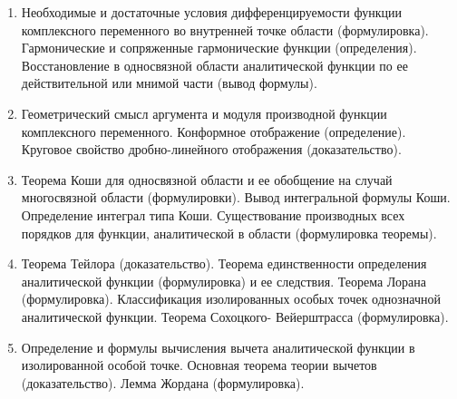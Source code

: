 % 
%

\begin{enumerate}

\item Необходимые и достаточные условия дифференцируемости функции комплексного переменного во внутренней точке области (формулировка). Гармонические и сопряженные гармонические функции (определения). Восстановление в односвязной области  аналитической функции по ее действительной или мнимой части (вывод формулы). 

\item Геометрический смысл  аргумента и модуля  производной функции комплексного переменного.
Конформное отображение (определение). Круговое свойство дробно-линейного отображения (доказательство).

\item Теорема Коши для односвязной области и ее обобщение на случай многосвязной области (формулировки). Вывод интегральной формулы Коши. Определение интеграл типа Коши. Существование производных всех порядков для функции, аналитической в области (формулировка теоремы).

\item Теорема Тейлора (доказательство). Теорема единственности определения аналитической функции (формулировка) и ее следствия. Теорема Лорана (формулировка). Классификация изолированных особых точек однозначной аналитической функции. Теорема Сохоцкого- Вейерштрасса (формулировка).

\item Определение и формулы вычисления вычета  аналитической функции в изолированной особой точке. Основная теорема теории вычетов (доказательство). Лемма Жордана (формулировка).


\end{enumerate}
